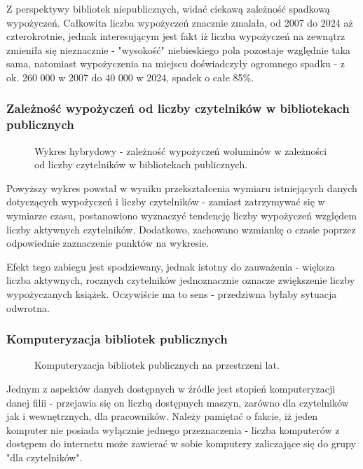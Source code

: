 \documentclass[12pt]{article}
\begin{document}
Z perspektywy bibliotek niepublicznych, widać ciekawą zależność spadkową wypożyczeń. Całkowita liczba wypożyczeń znacznie zmalała, od 2007 do 2024 aż czterokrotnie, 
jednak interesującym jest fakt iż liczba wypożyczeń na zewnątrz zmieniła się nieznacznie - "wysokość" niebieskiego pola pozostaje względnie taka sama, 
natomiast wypożyczenia na miejscu doświadczyły ogromnego spadku - z ok. 260 000 w 2007 do 40 000 w 2024, spadek o całe 85\%.  

\subsubsection{Zależność wypożyczeń od liczby czytelników w bibliotekach publicznych}
\begin{figure}[H]
    
    \caption{Wykres hybrydowy - zależność wypożyczeń woluminów w zależności od liczby czytelników w bibliotekach publicznych.}
\end{figure}

Powyższy wykres powstał w wyniku przekształcenia wymiaru istniejących danych dotyczących wypożyczeń i liczby czytelników - zamiast zatrzymywać się w wymiarze czasu, 
postanowiono wyznaczyć tendencję liczby wypożyczeń względem liczby aktywnych czytelników. Dodatkowo, zachowano wzmiankę o czasie poprzez odpowiednie zaznaczenie punktów 
na wykresie.

Efekt tego zabiegu jest spodziewany, jednak istotny do zauważenia - większa liczba aktywnych, rocznych czytelników jednoznacznie oznacze zwiększenie liczby wypożyczanych 
książek. Oczywiście ma to sens - przedziwna byłaby sytuacja odwrotna.

\subsubsection{Komputeryzacja bibliotek publicznych}
\begin{figure}[H]
    
    \caption{Komputeryzacja bibliotek publicznych na przestrzeni lat.}
\end{figure}
Jednym z aspektów danych dostępnych w źródle jest stopień komputeryzacji danej filii - przejawia się on liczbą dostępnych maszyn, zarówno dla czytelników jak i 
wewnętrznych, dla pracowników. Należy pamiętać o fakcie, iż jeden komputer nie posiada wyłącznie jednego przeznaczenia - liczba komputerów z dostępem do internetu może 
zawierać w sobie komputery zaliczające się do grupy "dla czytelników".
\end{document}

